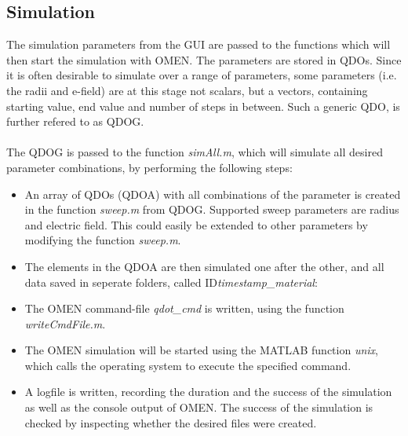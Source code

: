 \subsection{Simulation}

The simulation parameters from the GUI are passed to the functions which will then start the simulation with OMEN.
The parameters are stored in QDOs. Since it is often desirable to simulate over a range of parameters, some parameters (i.e. the radii and e-field) are at this stage not scalars, but a vectors, containing starting value, end value and number of steps in between. Such a generic QDO,  is further refered to as QDOG.
\\\\
The QDOG is passed to the function \textit{simAll.m}, which will simulate all desired parameter combinations, by performing the following steps:
\begin{itemize}
\item An array of QDOs (QDOA) with all combinations of the parameter is created in the function \textit{sweep.m} from QDOG. Supported sweep parameters are radius and electric field. This could easily be extended to other parameters by modifying the function \textit{sweep.m}.
\item The elements in the QDOA are then simulated one after the other, and all data saved in seperate folders, called ID\textit{timestamp\_material}: 
\item The OMEN command-file \textit{qdot\_cmd} is written, using the function \textit{writeCmdFile.m}.
\item The OMEN simulation will be started using the MATLAB function \textit{unix}, which calls the operating system to execute the specified command.
\item A logfile is written, recording the duration and the success of the simulation as well as the console output of OMEN. The success of the simulation is checked by inspecting whether the desired files were created.
\end{itemize}

